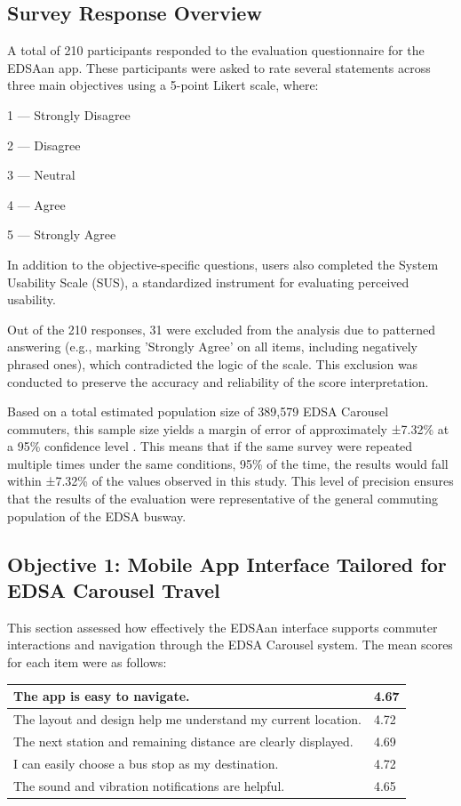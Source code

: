 \documentclass[journal]{./IEEE/IEEEtran}
\begin{document}
\subsection{Survey Response Overview}

A total of 210 participants responded to the evaluation questionnaire for the EDSAan app. These participants were asked to rate several statements across three main objectives using a 5-point Likert scale, where:

1 — Strongly Disagree

2 — Disagree

3 — Neutral

4 — Agree

5 — Strongly Agree

In addition to the objective-specific questions, users also completed the System Usability Scale (SUS), a standardized instrument for evaluating perceived usability.

Out of the 210 responses, 31 were excluded from the analysis due to patterned answering (e.g., marking 'Strongly Agree' on all items, including negatively phrased ones), which contradicted the logic of the scale. This exclusion was conducted to preserve the accuracy and reliability of the score interpretation.

Based on a total estimated population size of 389,579 EDSA Carousel commuters, this sample size yields a margin of error of approximately ±7.32\% at a 95\% confidence level \cite{Ref:020}. This means that if the same survey were repeated multiple times under the same conditions, 95\% of the time, the results would fall within ±7.32\% of the values observed in this study. This level of precision ensures that the results of the evaluation were representative of the general commuting population of the EDSA busway.

\subsection{Objective 1: Mobile App Interface Tailored for EDSA Carousel Travel}
This section assessed how effectively the EDSAan interface supports commuter interactions and navigation through the EDSA Carousel system. The mean scores for each item were as follows:


\begin{center}
\begin{tabular}{ | m{18em} | m{1cm} | } 
  \hline
  The app is easy to navigate.& 4.67 \\ 
  \hline
  The layout and design help me understand my current location. & 4.72 \\ 
  \hline
  The next station and remaining distance are clearly displayed. & 4.69\\ 
  \hline
  I can easily choose a bus stop as my destination. & 4.72\\ 
  \hline
  The sound and vibration notifications are helpful. & 4.65\\ 
  \hline
\end{tabular}
\end{center}
\end{document}
